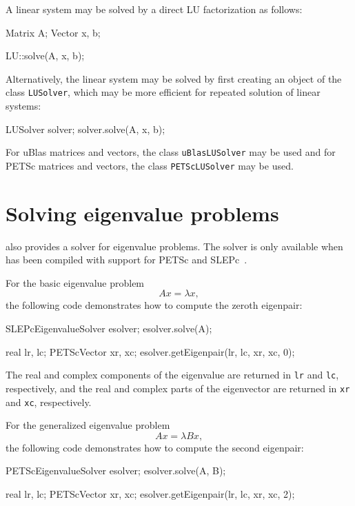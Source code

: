 A linear system may be solved by a direct LU factorization as follows:
\begin{code}
Matrix A;
Vector x, b;
  
LU::solve(A, x, b);
\end{code}
Alternatively, the linear system may be solved by first creating an
object of the class \texttt{LUSolver}, which may be more efficient for
repeated solution of linear systems:
\begin{code}
LUSolver solver;
solver.solve(A, x, b);
\end{code}

For uBlas matrices and vectors, the class \texttt{uBlasLUSolver} may
be used and for PETSc matrices and vectors, the class
\texttt{PETScLUSolver} may be used.

\section{Solving eigenvalue problems}

\dolfin{} also provides a solver for eigenvalue problems. 
The solver is only available when \dolfin{} has been compiled with support for 
PETSc and SLEPc~\cite{www:slepc}.

For the basic eigenvalue problem
%
\begin{equation}
  Ax = \lambda x,
\end{equation}
%
the following code demonstrates how to compute the zeroth eigenpair:
%
\begin{code} 
SLEPcEigenvalueSolver esolver; 
esolver.solve(A);

real lr, lc;
PETScVector xr, xc;
esolver.getEigenpair(lr, lc, xr, xc, 0);
\end{code} 
%
The real and complex components of the eigenvalue are returned in \texttt{lr}
and \texttt{lc}, respectively, and the real and complex parts of the eigenvector
are returned in \texttt{xr} and \texttt{xc}, respectively.

For the generalized eigenvalue problem
\begin{equation}
 A x = \lambda B x,
\end{equation}
the following code demonstrates how to compute the second eigenpair:
\begin{code} 
PETScEigenvalueSolver esolver; 
esolver.solve(A, B);

real lr, lc;
PETScVector xr, xc;
esolver.getEigenpair(lr, lc, xr, xc, 2);
\end{code} 
